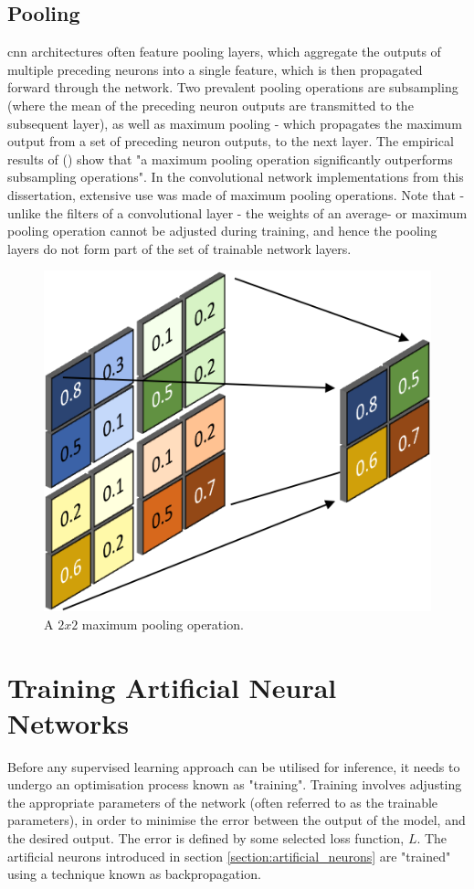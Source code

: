 \documentclass[11pt,oneside,openany,a4paper,english, report, goldenblock
]{usthesis}
\begin{document}
\subsection{Pooling}
\acrshort{cnn} architectures often feature pooling layers, which aggregate the outputs of multiple preceding neurons into a single feature, which is then propagated forward through the network. Two prevalent pooling operations are subsampling (where the mean of the preceding neuron outputs are transmitted to the subsequent layer), as well as maximum pooling - which propagates the maximum output from a set of preceding neuron outputs, to the next layer. The empirical results of  (\citeyear{Scherer2010}) show that "a maximum pooling operation significantly outperforms subsampling operations". In the convolutional network implementations from this dissertation, extensive use was made of maximum pooling operations. Note that - unlike the filters of a convolutional layer - the weights of an average- or maximum pooling operation cannot be adjusted during training, and hence the pooling layers do not form part of the set of trainable network layers.

\begin{figure}[h]
	\centering
	\includegraphics[width=0.4\linewidth]{Images/Diagrams/Max-Pooling_Operation}
	\caption[A $2x2$ maximum pooling operation.]{A $2x2$ maximum pooling operation.}
	\label{fig:max-poolingoperation}
\end{figure}

\section{Training Artificial Neural Networks}
Before any supervised learning approach can be utilised for inference, it needs to undergo an optimisation process known as "training". Training involves adjusting the appropriate parameters of the network (often referred to as the trainable parameters), in order to minimise the error between the output of the model, and the desired output. 
The error is defined by some selected loss function, $L$.
The artificial neurons introduced in section \ref{section:artificial_neurons} are "trained" using a technique known as backpropagation. 
\end{document}
